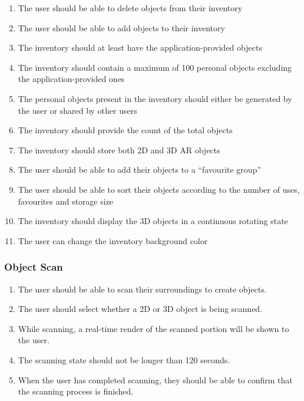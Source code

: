 \documentclass{article}
\begin{document}
\begin{enumerate}[align=left, label=\textbf{IV-FR\arabic*:}]
    \item The user should be able to delete objects from their inventory
    \item The user should be able to add objects to their inventory
    \item The inventory should at least have the application-provided objects
    \item The inventory should contain a maximum of 100 personal objects excluding the application-provided ones
    \item The personal objects present in the inventory should either be generated by the user or shared by other users
    \item The inventory should provide the count of the total objects
    \item The inventory should store both 2D and 3D AR objects
    \item The user should be able to add their objects to a “favourite group”
    \item The user should be able to sort their objects according to the number of uses, favourites and storage size
    \item The inventory should display the 3D objects in a continuous rotating state
    \item The user can change the inventory background color
\end{enumerate}

\subsubsection{Object Scan}
\label{ssub:obj_scan}
\begin{enumerate}[align=left, label=\textbf{OS-FR\arabic*:}]
    \item The user should be able to scan their surroundings to create objects.
    \item The user should select whether a 2D or 3D object is being scanned.
    \item While scanning, a real-time render of the scanned portion will be shown to the user.
    \item The scanning state should not be longer than 120 seconds.
    \item When the user has completed scanning, they should be able to confirm that the scanning process is finished.
\end{enumerate}
\end{document}
